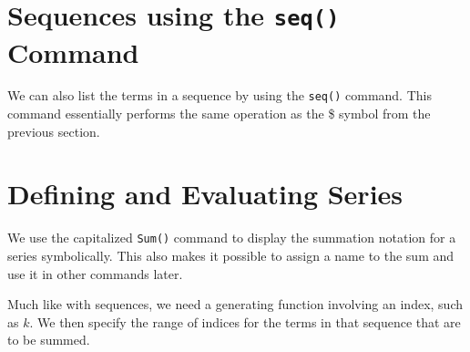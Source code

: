 \section{Sequences using the \texttt{seq()} Command}
\label{sec:sequences_using_the_seq_command}

We can also list the terms in a sequence by using the \texttt{seq()} command. This command essentially performs the same operation as the \$ symbol from the previous section.


\begin{maplegroup}
\begin{mapleinput}
\end{mapleinput}
\mapleresult
\begin{maplelatex}
\end{maplelatex}
\end{maplegroup}

\section{Defining and Evaluating Series}
\label{sec:defining_and_evaluating_series}

We use the capitalized \texttt{Sum()} command to display the summation notation for a series symbolically. This also makes it possible to assign a name to the sum and use it in other commands later.

Much like with sequences, we need a generating function involving an index, such as $k$. We then specify the range of indices for the terms in that sequence that are to be summed.

\begin{maplegroup}
\begin{mapleinput}
\end{mapleinput}
\mapleresult
\begin{maplelatex}
\end{maplelatex}
\end{maplegroup}

